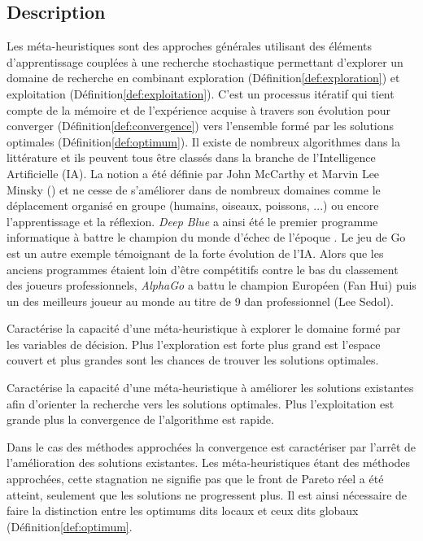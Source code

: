 \subsection{Description} %
\label{sub:description}
Les méta-heuristiques sont des approches générales utilisant des éléments
d’apprentissage couplées à une recherche stochastique permettant d’explorer un
domaine de recherche en combinant exploration (Définition\ref{def:exploration})
et exploitation (Définition\ref{def:exploitation}). C’est un processus itératif
qui tient compte de la mémoire et de l’expérience acquise à travers son
évolution pour converger (Définition\ref{def:convergence}) vers l’ensemble formé
par les solutions optimales (Définition\ref{def:optimum}). Il existe de nombreux
algorithmes dans la littérature et ils peuvent tous être classés dans la branche
de l’Intelligence Artificielle (IA). La notion a été définie par John McCarthy
et Marvin Lee Minsky () et ne cesse de s’améliorer dans de
nombreux domaines comme le déplacement organisé en groupe (humains, oiseaux,
poissons, ...) ou encore l’apprentissage et la réflexion. \textit{Deep Blue} a
ainsi été le premier programme informatique à battre le champion du monde
d’échec de l’époque \parencite{Hsu199970}. Le jeu de Go est un autre exemple
témoignant de la forte évolution de l’IA. Alors que les anciens programmes
étaient loin d’être compétitifs contre le bas du classement des joueurs
professionnels, \textit{AlphaGo} \parencite{Silver2016484} a battu le
champion Européen (Fan Hui) puis un des meilleurs joueur au monde au titre de 9 dan
professionnel (Lee Sedol).

\begin{Def}[Exploration]\label{def:exploration}
Caractérise la capacité d’une méta-heuristique à explorer le domaine formé par les
variables de décision. Plus l’exploration est forte plus grand est l’espace couvert
et plus grandes sont les chances de trouver les solutions optimales.
\end{Def}

\begin{Def}[Exploitation]\label{def:exploitation}
Caractérise la capacité d’une méta-heuristique à améliorer les solutions existantes
afin d’orienter la recherche vers les solutions optimales. Plus l’exploitation est
grande plus la convergence de l’algorithme est rapide.
\end{Def}

\begin{Def}[Convergence]\label{def:convergence}
Dans le cas des méthodes approchées la convergence est caractériser par l’arrêt
de l’amélioration des solutions existantes. Les méta-heuristiques étant des
méthodes approchées, cette stagnation ne signifie pas que le front de Pareto réel
a été atteint, seulement que les solutions ne progressent plus. Il est ainsi
nécessaire de faire la distinction entre les optimums dits locaux et ceux dits
globaux (Définition\ref{def:optimum}.
\end{Def}


